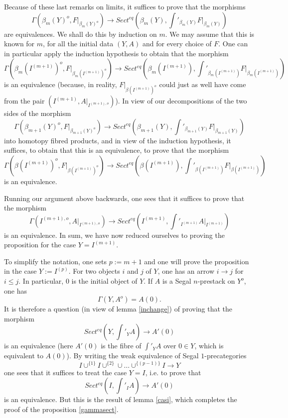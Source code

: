 Because of these last remarks on limits,
it suffices to prove that the morphisms
$$
\Gamma (\beta _m(Y)^o, F|_{\beta _m(Y)^o})\rightarrow
Sect ^{eq}(\beta _m(Y), \int
'_{\beta _m(Y)}F |_{\beta _m(Y)})
$$
are equivalences. We shall do this by induction on $m$.
We may assume that this is known for $m$, for all
the initial data $(Y,A)$ and
for every choice of $F$. One can in particular apply
the induction hypothesis to obtain that the morphism
$$
\Gamma (\beta _m(I^{(m+1)})^o, F|_{\beta _m(I^{(m+1)})^o})
\rightarrow Sect ^{eq}(\beta _m(I^{(m+1)}), \int
'_{\beta _m(I^{(m+1)})}F |_{\beta _m(I^{(m+1)})})
$$
is an equivalence
(because, in reality, $F|_{\beta (I^{(m+1)})^o}$ could just as well
have come from the pair
$(I^{(m+1)}, A|_{I^{(m+1), o}})$). In view of our decompositions of the two
sides of the morphism
$$
\Gamma (\beta _{m+1}(Y)^o, F|_{\beta _{m+1}(Y)^o})\rightarrow
Sect ^{eq}(\beta _{m+1}(Y),
\int '_{\beta _{m+1}(Y)}F |_{\beta _{m+1}(Y)})
$$
into homotopy fibred products, and in view of the induction hypothesis, it
suffices, to obtain that this is an equivalence, to prove that the
morphism
$$
\Gamma (\beta (I^{(m+1)})^o, F|_{\beta (I^{(m+1)})^o})\rightarrow
Sect ^{eq}(\beta (I^{(m+1)}),
\int '_{\beta (I^{(m+1)})}F |_{\beta (I^{(m+1)})})
$$
is an equivalence.

Running our argument above backwards,
one sees that it suffices to prove that the morphism
$$
\Gamma (I^{(m+1),o}, A|_{I^{(m+1),o}})\rightarrow
Sect ^{eq}(I^{(m+1)},
\int '_{I^{(m+1)}}A |_{I^{(m+1)}})
$$
is an equivalence.
In sum, we have now reduced ourselves to proving the proposition for
the case $Y= I^{(m+1)}$.

To simplify the notation, one sets $p:= m+1$ and
one will
prove the proposition in the case $Y:= I^{(p)}$. For two objects
$i$ and $j$ of $Y$, one has
an arrow $i\rightarrow j$ for $i\leq
j$. In particular, $0$ is the initial object of $Y$. If $A$ is a Segal $n$-prestack
on $Y^o$, one has
$$
\Gamma (Y, A^o) =A(0).
$$
It is therefore a question (in view of lemma \ref{inchange}) of proving that
the morphism
$$
Sect ^{eq}(Y, \int '_YA)\rightarrow A'(0)
$$
is an equivalence (here $A'(0)$ is the fibre of $\int '_YA$ over
$0\in Y$, which is equivalent to $A(0)$). By writing the weak
equivalence of Segal $1$-precategories
$$
I\cup ^{\{ 1\}} I \cup ^{\{ 2\} } \cup \ldots \cup ^{\{ (p-1)\} } I
\rightarrow Y
$$
one sees that it suffices to treat the case $Y=I$, i.e. to prove that
$$
Sect ^{eq} (I, \int '_IA)\rightarrow A'(0)
$$
is an equivalence.
But this is the result of lemma \ref{casi}, which completes
the proof of the proposition
\ref{gammasect}. \eop






